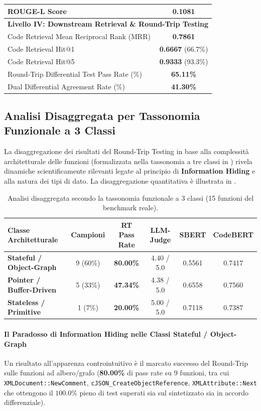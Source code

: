 \begin{table}[htbp]
\begin{tabular}{lc}
ROUGE-L Score & \textbf{0.1081} \\
\midrule
\multicolumn{2}{l}{\textbf{Livello IV: Downstream Retrieval \& Round-Trip Testing}} \\
Code Retrieval Mean Reciprocal Rank (MRR) & \textbf{0.7861} \\
Code Retrieval Hit@1 & \textbf{0.6667} (66.7\%) \\
Code Retrieval Hit@5 & \textbf{0.9333} (93.3\%) \\
Round-Trip Differential Test Pass Rate (\%) & \textbf{65.11\%} \\
Dual Differential Agreement Rate (\%) & \textbf{41.30\%} \\
\bottomrule
\end{tabular}
\end{table}

\subsection{Analisi Disaggregata per Tassonomia Funzionale a 3 Classi}
La disaggregazione dei risultati del Round-Trip Testing in base alla complessità architetturale delle funzioni (formalizzata nella tassonomia a tre classi in ) rivela dinamiche scientificamente rilevanti legate al principio di \textbf{Information Hiding} e alla natura dei tipi di dato. La disaggregazione quantitativa è illustrata in .

\begin{table}[htbp]
\centering
\caption{Analisi disaggregata secondo la tassonomia funzionale a 3 classi (15 funzioni del benchmark reale).}
\label{tab:functional_breakdown}
\begin{tabular}{lccccc}
\toprule
\textbf{Classe Architetturale} & \textbf{Campioni} & \textbf{RT Pass Rate} & \textbf{LLM-Judge} & \textbf{SBERT} & \textbf{CodeBERT} \\
\midrule
\textbf{Stateful / Object-Graph} & 9 (60\%) & \textbf{80.00\%} & 4.40 / 5.0 & 0.5561 & 0.7417 \\
\textbf{Pointer / Buffer-Driven} & 5 (33\%) & \textbf{47.34\%} & 4.38 / 5.0 & 0.6558 & 0.7560 \\
\textbf{Stateless / Primitive} & 1 (7\%) & \textbf{20.00\%} & 5.00 / 5.0 & 0.7118 & 0.7387 \\
\bottomrule
\end{tabular}
\end{table}

\paragraph{Il Paradosso di Information Hiding nelle Classi Stateful / Object-Graph}
Un risultato all'apparenza controintuitivo è il marcato successo del Round-Trip sulle funzioni ad albero/grafo (\textbf{80.00\%} di pass rate su 9 funzioni, tra cui \texttt{XMLDocument::NewComment}, \texttt{cJSON\_CreateObjectReference}, \texttt{XMLAttribute::Next} che ottengono il $100.0\%$ pieno di test superati sia sul sintetizzato sia in accordo differenziale).


